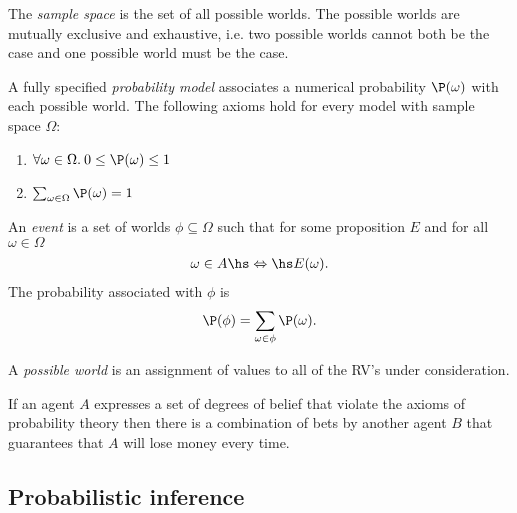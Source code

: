 \documentclass{article}
\begin{document}
\begin{definition}
    The \emph{sample space} is the set of all possible worlds.
    The possible worlds are mutually exclusive and exhaustive, i.e.
    two possible worlds cannot both be the case and one possible world must
    be the case.
\end{definition}

\begin{definition}
    A fully specified \emph{probability model} associates a numerical probability
    $\P(\omega)$ with each possible world. The following axioms hold for every
    model with sample space $\Omega$:
    \begin{enumerate}[label=P\arabic*.]
        \item $\forall \omega\in\Omega.\:0\leq\P(\omega)\leq 1$
        \item $\sum_{\omega\in\Omega}\P(\omega)=1$ 
    \end{enumerate}
\end{definition}

\begin{definition}
    An \emph{event} is a set of worlds $\phi\subseteq \Omega$ such that
    for some proposition $E$ and for all $\omega\in\Omega$
    \begin{align*}
        \omega\in A\hs\Leftrightarrow\hs E(\omega).
    \end{align*}
    The probability associated with $\phi$ is
    \begin{align*}
        \P(\phi)=\sum_{\omega\in\phi} \P(\omega).
    \end{align*}
\end{definition}

\begin{definition}
    A \emph{possible world} is an assignment of values to all of the RV's
    under consideration.
\end{definition}

\begin{theorem}[De Finetti]
    If an agent $A$ expresses a set of degrees of belief that violate
    the axioms of probability theory then there is a combination of
    bets by another agent $B$ that guarantees that $A$ will lose money
    every time. 
\end{theorem}

\subsection{Probabilistic inference}
\end{document}
